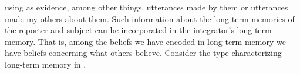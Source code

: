 using as evidence, among other things, utterances made by them or utterances made
my others about them.  Such information about the
long-term memories of the reporter and subject can be incorporated in
the integrator's long-term memory.  That is, among the beliefs we have
encoded in long-term memory we have beliefs concerning what others
believe.  Consider the type characterizing long-term memory in
\nexteg{}.
\begin{ex} 
\end{ex}
